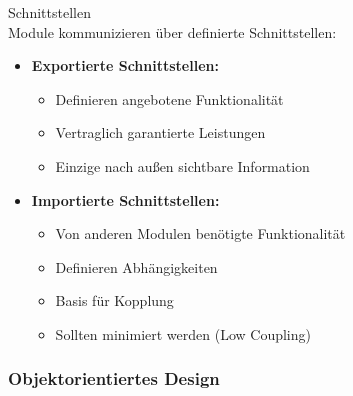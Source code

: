 \begin{definition}{Schnittstellen}\\
Module kommunizieren über definierte Schnittstellen:

\begin{itemize}
    \item \textbf{Exportierte Schnittstellen:}
    \begin{itemize}
        \item Definieren angebotene Funktionalität
        \item Vertraglich garantierte Leistungen
        \item Einzige nach außen sichtbare Information
    \end{itemize}
    
    \item \textbf{Importierte Schnittstellen:}
    \begin{itemize}
        \item Von anderen Modulen benötigte Funktionalität
        \item Definieren Abhängigkeiten
        \item Basis für Kopplung
        \item Sollten minimiert werden (Low Coupling)
    \end{itemize}
\end{itemize}
\end{definition}

\subsubsection{Objektorientiertes Design}

